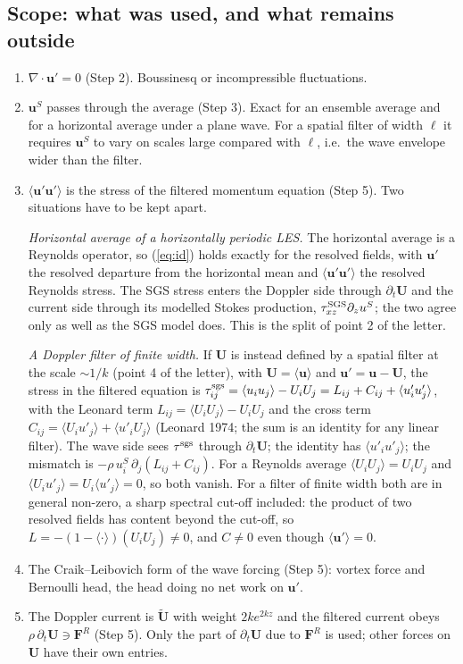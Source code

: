 \documentclass[10pt]{article}
\newcommand{\av}[1]{\langle #1\rangle}\newcommand{\uS}{\bm u^S}\newcommand{\WS}{\mathcal W_S}\newcommand{\PS}{\mathcal P_S}
\newcommand{\Ut}{\widetilde{\bm U}}
\newcommand{\bu}{\bm u}\newcommand{\bU}{\bm U}\newcommand{\bxi}{\bm\xi}\newcommand{\dd}{\mathrm d}
\begin{document}
\subsection{Scope: what was used, and what remains outside}
\begin{enumerate}[leftmargin=1.6em,itemsep=1pt,topsep=1pt]
\item $\nabla\cdot\bu'=0$ (Step 2). Boussinesq or incompressible fluctuations.
\item $\uS$ passes through the average (Step 3). Exact for an ensemble average and for a horizontal average under a plane wave. For a spatial filter of width $\ell$ it requires $\uS$ to vary on scales large compared with $\ell$, i.e.\ the wave envelope wider than the filter.
\item $\av{\bu'\bu'}$ is the stress of the filtered momentum equation (Step 5). Two situations have to be kept apart.

\emph{Horizontal average of a horizontally periodic LES.} The horizontal average is a Reynolds operator, so (\ref{eq:id}) holds exactly for the resolved fields, with $\bu'$ the resolved departure from the horizontal mean and $\av{\bu'\bu'}$ the resolved Reynolds stress. The SGS stress enters the Doppler side through $\partial_t\bU$ and the current side through its modelled Stokes production, $\tau^{\rm SGS}_{xz}\partial_zu^S$; the two agree only as well as the SGS model does. This is the split of point 2 of the letter.

\emph{A Doppler filter of finite width.} If $\bU$ is instead defined by a spatial filter at the scale $\sim1/k$ (point 4 of the letter), with $\bU=\av\bu$ and $\bu'=\bu-\bU$, the stress in the filtered equation is $\tau^{\rm sgs}_{ij}=\av{u_iu_j}-U_iU_j=L_{ij}+C_{ij}+\av{u'_iu'_j}$, with the Leonard term $L_{ij}=\av{U_iU_j}-U_iU_j$ and the cross term $C_{ij}=\av{U_iu'_j}+\av{u'_iU_j}$ (Leonard 1974; the sum is an identity for any linear filter). The wave side sees $\tau^{\rm sgs}$ through $\partial_t\bU$; the identity has $\av{u'_iu'_j}$; the mismatch is $-\rho\,u^S_i\,\partial_j(L_{ij}+C_{ij})$. For a Reynolds average $\av{U_iU_j}=U_iU_j$ and $\av{U_iu'_j}=U_i\av{u'_j}=0$, so both vanish. For a filter of finite width both are in general non-zero, a sharp spectral cut-off included: the product of two resolved fields has content beyond the cut-off, so $L=-(1-\av\cdot)(U_iU_j)\neq0$, and $C\neq0$ even though $\av{\bu'}=0$.
\item The Craik--Leibovich form of the wave forcing (Step 5): vortex force and Bernoulli head, the head doing no net work on $\bu'$.
\item The Doppler current is $\Ut$ with weight $2ke^{2kz}$ and the filtered current obeys $\rho\,\partial_t\bU\ni\bm F^R$ (Step 5). Only the part of $\partial_t\bU$ due to $\bm F^R$ is used; other forces on $\bU$ have their own entries.
\end{enumerate}
\end{document}
